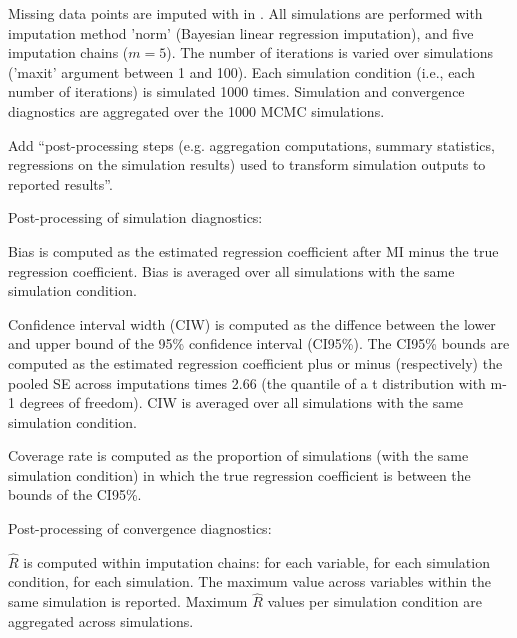 \documentclass[article]{jss}
\begin{document}
Missing data points are imputed with  in . All simulations are performed with imputation method 'norm' (Bayesian linear regression imputation), and five imputation chains ($m = 5$). The number of iterations is varied over simulations ('maxit' argument between 1 and 100). Each simulation condition (i.e., each number of iterations) is simulated 1000 times. Simulation and convergence diagnostics are aggregated over the 1000 MCMC simulations. 


Add ``post-processing steps (e.g. aggregation computations, summary statistics, regressions on the simulation results) used to transform simulation outputs to reported results''. %

Post-processing of simulation diagnostics:

Bias is computed as the estimated regression coefficient after MI minus the true regression coefficient. Bias is averaged over all simulations with the same simulation condition.

Confidence interval width (CIW) is computed as the diffence between the lower and upper bound of the 95\% confidence interval (CI95\%). The CI95\% bounds are computed as the estimated regression coefficient plus or minus (respectively) the pooled SE across imputations times 2.66 (the quantile of a t distribution with m-1 degrees of freedom). CIW is averaged over all simulations with the same simulation condition.

Coverage rate is computed as the proportion of simulations (with the same simulation condition) in which the true regression coefficient is between the bounds of the CI95\%. 

Post-processing of convergence diagnostics:

$\widehat{R}$ is computed within imputation chains: for each variable, for each simulation condition, for each simulation. The maximum value across variables within the same simulation is reported. Maximum $\widehat{R}$ values per simulation condition are aggregated across simulations.
\end{document}
